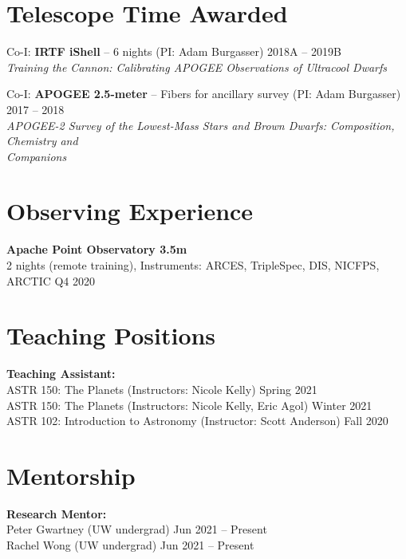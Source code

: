 \documentclass[margin,line]{resume}
\begin{document}
\begin{resume}

\section{\mysidestyle \textcolor{bcolor}{Telescope Time Awarded}}
Co-I: \textbf{IRTF iShell} -- 6 nights (PI: Adam Burgasser) \hfill 2018A -- 2019B \\ 
\textsl{Training the Cannon: Calibrating APOGEE Observations of Ultracool Dwarfs} 

Co-I: \textbf{APOGEE 2.5-meter} -- Fibers for ancillary survey (PI: Adam Burgasser) \hfill 2017 -- 2018 \\
\textsl{APOGEE-2 Survey of the Lowest-Mass Stars and Brown Dwarfs: Composition, Chemistry and \\ Companions}



\section{\mysidestyle \textcolor{bcolor}{Observing Experience}}
\textbf{Apache Point Observatory 3.5m}  \\
2 nights (remote training), Instruments: ARCES, TripleSpec, DIS, NICFPS, ARCTIC \hfill Q4 2020


\section{\mysidestyle \textcolor{bcolor}{Teaching Positions}}
\textbf{Teaching Assistant:} \\
ASTR 150: The Planets (Instructors: Nicole Kelly) \hfill Spring 2021  \\
ASTR 150: The Planets (Instructors: Nicole Kelly, Eric Agol) \hfill Winter 2021  \\
ASTR 102: Introduction to Astronomy (Instructor: Scott Anderson) \hfill Fall 2020 


\section{\mysidestyle \textcolor{bcolor}{Mentorship}}
\textbf{Research Mentor:} \\
Peter Gwartney (UW undergrad) \hfill Jun 2021 -- Present \\
Rachel Wong (UW undergrad) \hfill Jun 2021 -- Present 


\end{resume}
\end{document}
